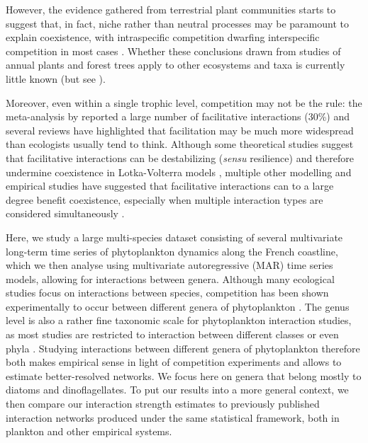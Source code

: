 \documentclass[10pt]{article}
\begin{document}
However, the evidence gathered from terrestrial plant communities
starts to suggest that, in fact, niche rather than neutral processes
may be paramount to explain coexistence, with intraspecific competition
dwarfing interspecific competition in most cases \citep{adler_coexistence_2010,adler_competition_2018}.
Whether these conclusions drawn from studies of annual plants and
forest trees apply to other ecosystems and taxa is currently little
known (but see \citealt{mutshinda_what_2009}).

Moreover, even within a single trophic level, competition may not
be the rule: the meta-analysis by \citet{adler_competition_2018}
reported a large number of facilitative interactions (30\%) and several
reviews \citep{brooker_facilitation_2008,mcintire2014facilitation}
have highlighted that facilitation may be much more widespread than
ecologists usually tend to think. Although some theoretical studies
suggest that facilitative interactions can be destabilizing (\emph{sensu}
resilience) and therefore undermine coexistence in Lotka-Volterra
models \citep{coyte_ecology_2015}, multiple other modelling \citep{gross_positive_2008}
and empirical \citep{brooker_facilitation_2008,cavieres2009facilitative}
studies have suggested that facilitative interactions can to a large
degree benefit coexistence, especially when multiple interaction types
are considered simultaneously \citep{mougi2012diversity,garcia2018effect}.

Here, we study a large multi-species dataset consisting of several
multivariate long-term time series of phytoplankton dynamics along
the French coastline, which we then analyse using multivariate autoregressive
(MAR) time series models, allowing for interactions between genera.
Although many ecological studies focus on interactions between species,
competition has been shown experimentally to occur between different
genera of phytoplankton \citep{titman_ecological_1976,descamps-julien_stable_2005}.
The genus level is also a rather fine taxonomic scale for phytoplankton
interaction studies, as most studies are restricted to interaction
between different classes or even phyla \citep{ives_estimating_2003,hampton_sixty_2008,griffiths_phytoplankton_2015}.
Studying interactions between different genera of phytoplankton therefore
both makes empirical sense in light of competition experiments and
allows to estimate better-resolved networks. We focus here on genera
that belong mostly to diatoms and dinoflagellates. To put our results
into a more general context, we then compare our interaction strength
estimates to previously published interaction networks produced under
the same statistical framework, both in plankton and other empirical
systems. 
\end{document}
